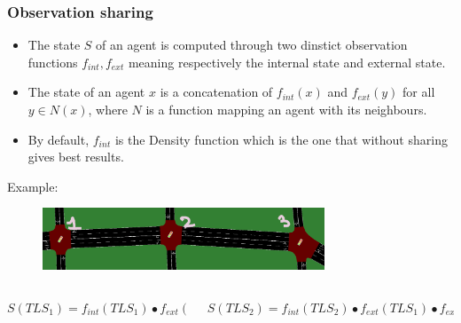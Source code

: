 \documentclass[dvipsnames]{beamer}
\begin{document}
\begin{frame}
\frametitle{Observation sharing}

  \begin{itemize}
    \item The state $S$ of an agent is computed through two dinstict observation functions $f_{int}, f_{ext}$ meaning respectively the internal state and external state. \\
    \item The state of an agent $x$ is a concatenation of $f_{int}(x)$ and $f_{ext}(y)$ for all $y \in N(x)$, where $N$ is a function mapping an agent with its neighbours. \\
    \item By default, $f_{int}$ is the Density function which is the one that without sharing gives best results.
  \end{itemize}

  Example:
  \begin{figure}
    \centering
    \includegraphics[width=0.75\textwidth]{figures/sumo-rf-tls-triplet.png}
  \end{figure}

  
  \begin{columns}
    \begin{column}{0.4\textwidth}
      \centering
      {\footnotesize$S({TLS}_{1}) = f_{int}({TLS}_{1}) \bullet f_{ext}({TLS}_{2})$}
    \end{column}
    \begin{column}{0.6\textwidth}
      \centering
      {\footnotesize$S({TLS}_{2}) = f_{int}({TLS}_{2}) \bullet f_{ext}({TLS}_{1}) \bullet f_{ext}({TLS}_{3})$}
    \end{column}
  \end{columns}
\end{frame}
\end{document}
